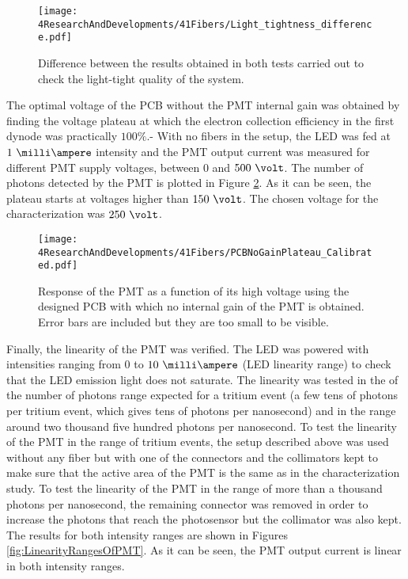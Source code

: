 \begin{figure}[h]
\centering
\texttt{[image: 4ResearchAndDevelopments/41Fibers/Light\_tightness\_difference.pdf]}
\caption{Difference between the results obtained in both tests carried out to check the light-tight quality of the system.\label{fig:LightTightnessTest}}
\end{figure}

The optimal voltage of the PCB without the PMT internal gain was obtained by finding the voltage plateau at which the electron collection efficiency in the first dynode was practically $100\%$.- With no fibers in the setup, the LED was fed at $1~\milli\ampere$ intensity and the PMT output current was measured for different PMT supply voltages, between $0$ and $500~\volt$. The number of photons detected by the PMT is plotted in Figure \ref{fig:PlateauNoGainPMT}. As it can be seen, the plateau starts at voltages higher than $150~\volt$. The chosen voltage for the characterization was $250~\volt$.

\begin{figure}[h]
\centering
\texttt{[image: 4ResearchAndDevelopments/41Fibers/PCBNoGainPlateau\_Calibrated.pdf]}
\caption{Response of the PMT as a function of its high voltage using the designed PCB with which no internal gain of the PMT is obtained. Error bars are included but they are too small to be visible.\label{fig:PlateauNoGainPMT}}
\end{figure}

Finally, the linearity of the PMT was verified. The LED was powered with intensities ranging from 0 to $10~\milli\ampere$ (LED linearity range) to check that the LED emission light does not saturate. The linearity was tested in the of the number of photons range expected for a tritium event (a few tens of photons per tritium event, which gives tens of photons per nanosecond) and in the range around two thousand five hundred photons per nanosecond. To test the linearity of the PMT in the range of tritium events, the setup described above was used without any fiber but with one of the connectors and the collimators kept to make sure that the active area of the PMT is the same as in the characterization study. To test the linearity of the PMT in the range of more than a thousand photons per nanosecond, the remaining connector was removed in order to increase the photons that reach the photosensor but the collimator was also kept. The results for both intensity ranges are shown in Figures \ref{fig:LinearityRangesOfPMT}. As it can be seen, the PMT output current is linear in both intensity ranges.

